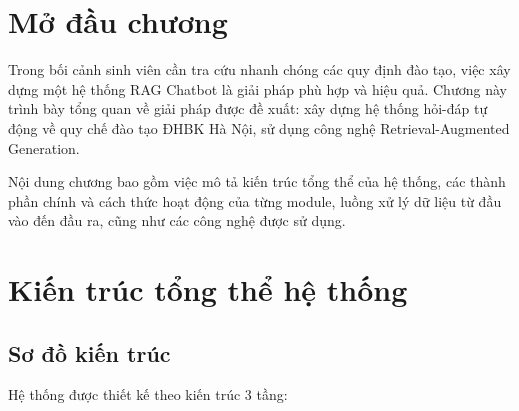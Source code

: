 \documentclass[../DoAn.tex]{subfiles}
\begin{document}
\section{Mở đầu chương}
Trong bối cảnh sinh viên cần tra cứu nhanh chóng các quy định đào tạo, việc xây dựng một hệ thống RAG Chatbot là giải pháp phù hợp và hiệu quả. Chương này trình bày tổng quan về giải pháp được đề xuất: xây dựng hệ thống hỏi-đáp tự động về quy chế đào tạo ĐHBK Hà Nội, sử dụng công nghệ Retrieval-Augmented Generation.

Nội dung chương bao gồm việc mô tả kiến trúc tổng thể của hệ thống, các thành phần chính và cách thức hoạt động của từng module, luồng xử lý dữ liệu từ đầu vào đến đầu ra, cũng như các công nghệ được sử dụng.

\section{Kiến trúc tổng thể hệ thống}

\subsection{Sơ đồ kiến trúc}
Hệ thống được thiết kế theo kiến trúc 3 tầng:
\end{document}
